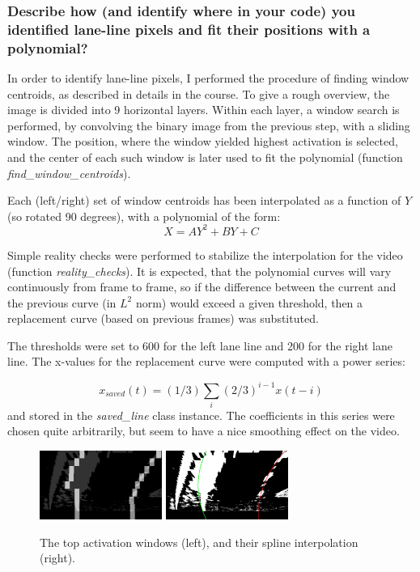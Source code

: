 \documentclass[a4paper,10pt]{article}
\begin{document}
\subsubsection{Describe how (and identify where in your code) you identified lane-line pixels and fit their positions with a polynomial?}

In order to identify lane-line pixels, I performed the procedure of finding window centroids, as described in details in the course.
To give a rough overview, the image is divided into 9 horizontal layers. Within each layer, a window search is performed,
by convolving the binary image from the previous step, with a sliding window. 
The position, where the window yielded highest activation is selected,
and the center of each such window is later used to fit the polynomial (function \emph{find\_window\_centroids}).

Each (left/right) set of window centroids has been interpolated as a function of $Y$ (so rotated 90 degrees), with a polynomial of the form:
%
$$
 X = AY^2 + BY + C
$$

Simple reality checks were performed to stabilize the interpolation for the video (function \emph{reality\_checks}).
It is expected, that the polynomial curves will vary continuously from frame to frame,
so if the difference between the current and the previous curve (in $L^2$ norm) would exceed a given threshold,
then a replacement curve (based on previous frames) was substituted.

The thresholds were set to 600 for the left lane line and 200 for the right lane line.
The x-values for the replacement curve were computed with a power series:

$$
x_{saved}(t) = (1/3) \sum_{i} (2/3)^{i-1}x(t-i) 
$$
%
and stored in the \emph{saved\_line} class instance.
The coefficients in this series were chosen quite arbitrarily, but seem to have a nice smoothing effect on the video.

\begin{figure}[h]
  \begin{center}
    \includegraphics[width=40mm]{../output_images/centroids.jpg}
    \quad
    \includegraphics[width=40mm]{../output_images/line_image.jpg}
  \caption{The top activation windows (left), and their spline interpolation (right).}
\end{center}
\end{figure}
\end{document}

